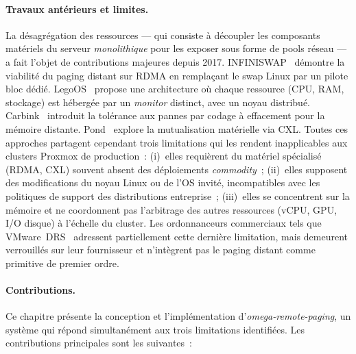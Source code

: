 \paragraph{Travaux antérieurs et limites.}
La désagrégation des ressources --- qui consiste à découpler les composants matériels du serveur \textit{monolithique} pour les exposer sous forme de pools réseau --- a fait l'objet de contributions majeures depuis 2017. INFINISWAP~\cite{gu_2017_infiniswap} démontre la viabilité du paging distant sur RDMA en remplaçant le swap Linux par un pilote bloc dédié. LegoOS~\cite{shan_2018_legoos} propose une architecture où chaque ressource (CPU, RAM, stockage) est hébergée par un \textit{monitor} distinct, avec un noyau distribué. Carbink~\cite{zhou_2022_carbink} introduit la tolérance aux pannes par codage à effacement pour la mémoire distante. Pond~\cite{li_2023_pond} explore la mutualisation matérielle via CXL. Toutes ces approches partagent cependant trois limitations qui les rendent inapplicables aux clusters Proxmox de production~: (i)~elles requièrent du matériel spécialisé (RDMA, CXL) souvent absent des déploiements \textit{commodity}~; (ii)~elles supposent des modifications du noyau Linux ou de l'OS invité, incompatibles avec les politiques de support des distributions entreprise~; (iii)~elles se concentrent sur la mémoire et ne coordonnent pas l'arbitrage des autres ressources (vCPU, GPU, I/O disque) à l'échelle du cluster. Les ordonnanceurs commerciaux tels que VMware~DRS~\cite{gulati_2012_drs} adressent partiellement cette dernière limitation, mais demeurent verrouillés sur leur fournisseur et n'intègrent pas le paging distant comme primitive de premier ordre.

\paragraph{Contributions.}
Ce chapitre présente la conception et l'implémentation d'\textit{omega-remote-paging}, un système qui répond simultanément aux trois limitations identifiées. Les contributions principales sont les suivantes~:

